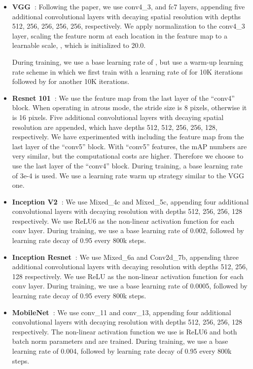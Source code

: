 \documentclass[10pt,twocolumn,letterpaper]{article}
\newcommand{\denselist}{
\itemsep -2pt\topsep-8pt\partopsep-8pt
}
\begin{document}
\begin{itemize}\denselist
\item {\bf VGG~\cite{simonyan2014very}}:
Following the paper, we use conv4\_3, and fc7 layers, appending
five additional convolutional layers with decaying spatial resolution with depths
512, 256, 256, 256, 256, respectively.
We apply  normalization to the conv4\_3 layer, scaling the feature norm at each location in the feature map to a learnable scale, , which is initialized to 20.0.


During training, we use a base learning rate of , but 
use a warm-up learning rate scheme in which we first train with a
learning rate of  for 10K iterations followed by 
for another 10K iterations.

\item {\bf Resnet 101~\cite{he2015deep}}:
We use the feature map from the last layer of the ``conv4'' block. When operating in atrous mode, the stride size is 8 pixels, otherwise it is 16 pixels. Five additional convolutional layers with decaying spatial resolution are appended, which have depths 512, 512, 256, 256, 128, respectively. We have experimented with including the feature map from the last layer of the ``conv5'' block. With ``conv5'' features, the mAP numbers are very similar, but the computational costs are higher. Therefore we choose to use the  last layer of the ``conv4'' block. During training, a base learning rate of 3e-4 is used. We use a learning rate warm up strategy similar to the VGG one. 
  
\item {\bf Inception V2~\cite{ioffe2015batch}}:
We use Mixed\_4c and Mixed\_5c, appending four additional convolutional layers with decaying resolution with depths
512, 256, 256, 128 respectively. We use ReLU6 as the non-linear activation function for each conv layer.
During training, we use a base learning rate of 0.002, followed by learning rate decay of 0.95 every 800k steps.
\item {\bf Inception Resnet~\cite{szegedy2016inception}}:
We use Mixed\_6a and Conv2d\_7b, appending three additional convolutional layers with decaying resolution with depths
512, 256, 128 respectively. We use ReLU as the non-linear activation function for each conv layer.
During training, we use a base learning rate of 0.0005, followed by learning rate decay of 0.95 every 800k steps.
\item {\bf MobileNet~\cite{howard17}}:
We use conv\_11 and conv\_13, appending four additional convolutional layers with decaying resolution with depths
512, 256, 256, 128 respectively. The non-linear activation function we use is ReLU6 and both batch norm parameters
 and  are trained. During training, we use a base learning rate of 0.004, followed by learning rate decay
of 0.95 every 800k steps.
\end{itemize}
\end{document}
